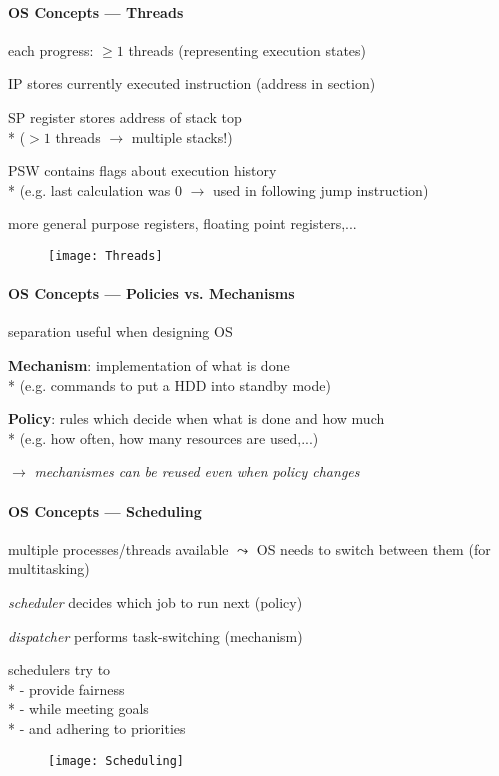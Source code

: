 \paragraph{OS Concepts --- Threads}
\begin{items}
	\item each progress: \( \geq 1 \) threads (representing execution states)
	\item IP stores currently executed instruction (address in  section)
	\item SP register stores address of stack top \\* (\( > 1 \) threads \( \to \) multiple stacks!)
	\item PSW contains flags about execution history \\* (e.g. last calculation was 0 \( \to \) used in following jump instruction)
	\item more general purpose registers, floating point registers,...
\end{items}
\begin{figure}[H]\centering\label{Threads}\texttt{[image: Threads]}\end{figure}

\paragraph{OS Concepts --- Policies vs. Mechanisms}
\begin{items}
	\item separation useful when designing OS
	\item \textbf{Mechanism}: implementation of what is done \\* (e.g. commands to put a HDD into standby mode)
	\item \textbf{Policy}: rules which decide when what is done and how much \\* (e.g. how often, how many resources are used,...)
	\item \( \to \) \emph{mechanismes can be reused even when policy changes}
\end{items}

\paragraph{OS Concepts --- Scheduling}
\begin{items}
	\item multiple processes/threads available \( \leadsto \) OS needs to switch between them (for multitasking)
	\item \emph{scheduler} decides which job to run next (policy)
	\item \emph{dispatcher} performs task-switching (mechanism)
	\item schedulers try to \\*
		- provide fairness \\*
		- while meeting goals \\*
		- and adhering to priorities
\end{items}
\begin{figure}[H]\centering\label{Scheduling}\texttt{[image: Scheduling]}\end{figure}

